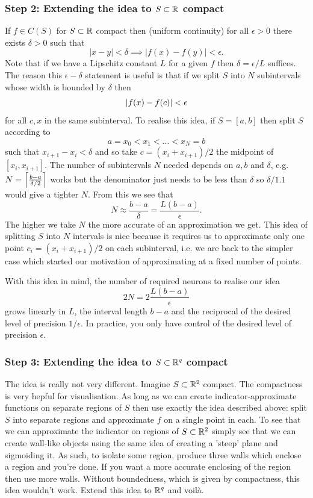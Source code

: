 \documentclass[11pt]{article}
\begin{document}
\subsubsection*{Step 2: Extending the idea to $S\subset\mathbb{R}$ compact}
If $f\in C(S)$ for $S\subset\mathbb{R}$ compact then (uniform continuity) for all $\epsilon>0$ there exists $\delta>0$ such that
$$
|x-y|<\delta\implies|f(x)-f(y)|<\epsilon.
$$
Note that if we have a Lipschitz constant $L$ for a given $f$ then $\delta=\epsilon/L$ suffices. The reason this $\epsilon-\delta$ statement is useful is that if we split $S$ into $N$ subintervals whose width is bounded by $\delta$ then
$$
\left|f(x)-f(c)\right|<\epsilon
$$
for all $c,x$ in the same subinterval. To realise this idea, if $S=[a,b]$ then split $S$ according to
$$
a=x_0<x_1<\dots<x_N=b
$$
such that $x_{i+1}-x_i<\delta$ and so take $c=(x_i+x_{i+1})/2$ the midpoint of $[x_i,x_{i+1}]$. The number of subintervals $N$ needed depends on $a,b$ and $\delta$, e.g. $N=\left\lceil\frac{b-a}{\delta/2}\right\rceil$ works but the denominator just needs to be less than $\delta$ so $\delta/1.1$ would give a tighter $N$. From this we see that
$$
N
\approx
\frac{b-a}{\delta}
=
\frac{L(b-a)}{\epsilon}.
$$
The higher we take $N$ the more accurate of an approximation we get. This idea of splitting $S$ into $N$ intervals is nice because it requires us to approximate only one point $c_i=(x_i+x_{i+1})/2$ on each subinterval, i.e. we are back to the simpler case which started our motivation of approximating at a fixed number of points.

With this idea in mind, the number of required neurons to realise our idea
$$
2N
=
2\frac{L(b-a)}{\epsilon}
$$
grows linearly in $L$, the interval length $b-a$ and the reciprocal of the desired level of precision $1/\epsilon$. In practice, you only have control of the desired level of precision $\epsilon$.

\subsubsection*{Step 3: Extending the idea to $S\subset\mathbb{R}^q$ compact}
The idea is really not very different. Imagine $S\subset\mathbb{R}^2$ compact. The compactness is very hepful for visualisation. As long as we can create indicator-approximate functions on separate regions of $S$ then use exactly the idea described above: split $S$ into separate regions and approximate $f$ on a single point in each. To see that we can approximate the indicator on regions of $S\subset\mathbb{R}^2$ simply see that we can create wall-like objects using the same idea of creating a 'steep' plane and sigmoiding it. As such, to isolate some region, produce three walls which enclose a region and you're done. If you want a more accurate enclosing of the region then use more walls. Without boundedness, which is given by compactness, this idea wouldn't work. Extend this idea to $\mathbb{R}^q$ and voilà.
\end{document}
